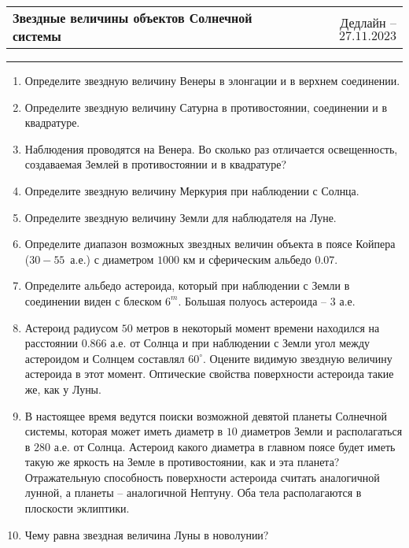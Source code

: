 \documentclass[12pt]{article}
\begin{document}
 \begin{tabularx}{\textwidth}{Xr}
  {\Large \textbf{Звездные величины объектов Солнечной системы}} & Дедлайн -- $27.11.2023$ \\
 \end{tabularx}
 \noindent\rule{\textwidth}{0.4pt}
 \begin{enumerate}
        \item Определите звездную величину Венеры в элонгации и в верхнем соединении.
        \item Определите звездную величину Сатурна в противостоянии, соединении и в квадратуре. 
        \item Наблюдения проводятся на Венера. Во сколько раз отличается освещенность, создаваемая Землей в противостоянии и в квадратуре?
        \item Определите звездную величину Меркурия при наблюдении с Солнца.
        \item Определите звездную величину Земли для наблюдателя на Луне.
        \item Определите диапазон возможных звездных величин объекта в поясе Койпера ($30-55$~а.е.) с диаметром $1000$ км и сферическим альбедо $0.07$.
        \item Определите альбедо астероида, который при наблюдении с Земли в соединении виден с блеском $6^m$. Большая полуось астероида -- $3$ а.е.
        \item Астероид радиусом $50$ метров в некоторый момент времени находился на расстоянии $0.866$ а.е. от Солнца и при наблюдении с Земли угол между астероидом и Солнцем составлял $60^{\circ}$. Оцените видимую звездную величину астероида в этот момент. Оптические свойства поверхности астероида такие же, как у Луны.
        \item В настоящее время ведутся поиски возможной девятой планеты Солнечной системы, которая может иметь диаметр в $10$ диаметров Земли и располагаться в $280$ а.е. от Солнца. Астероид какого диаметра в главном поясе будет иметь такую же яркость на Земле в противостоянии, как и эта планета? Отражательную способность поверхности астероида считать аналогичной лунной, а планеты -- аналогичной Нептуну. Оба тела располагаются в плоскости эклиптики.
        \item Чему равна звездная величина Луны в новолунии?
 \end{enumerate}
\end{document}
